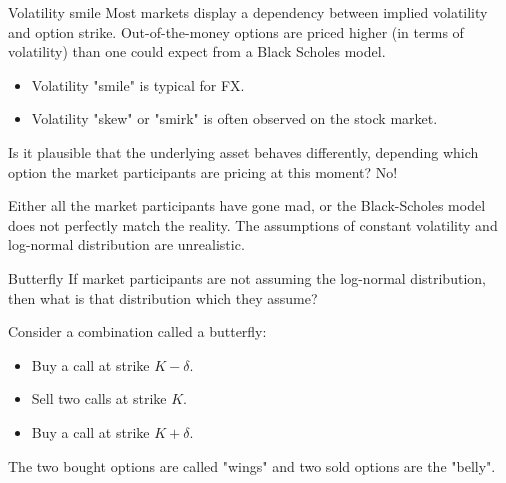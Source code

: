 \documentclass{beamer}
\begin{document}
\begin{frame}{Volatility smile}
\justify
Most markets display a dependency between implied volatility and option strike. Out-of-the-money options are priced higher (in terms of volatility) than one could expect from a Black Scholes model.

\begin{itemize}
\item Volatility "smile" is typical for FX.
\item Volatility "skew" or "smirk" is often observed on the stock market.
\end{itemize}

\justify
Is it plausible that the underlying asset behaves differently, depending which option the market participants are pricing at this moment? No!

\justify
Either all the market participants have gone mad, or the Black-Scholes model does not perfectly match the reality. The assumptions of constant volatility and log-normal distribution are unrealistic.
\end{frame}



\begin{frame}{Butterfly}
\justify
If market participants are not assuming the log-normal distribution, then what is that distribution which they assume?

\justify
Consider a combination called a butterfly:
\begin{itemize}
\item Buy a call at strike $K - \delta$.
\item Sell two calls at strike $K$.
\item Buy a call at strike $K + \delta$.
\end{itemize}

\justify
The two bought options are called "wings" and two sold options are the "belly".
\end{frame}
\end{document}
